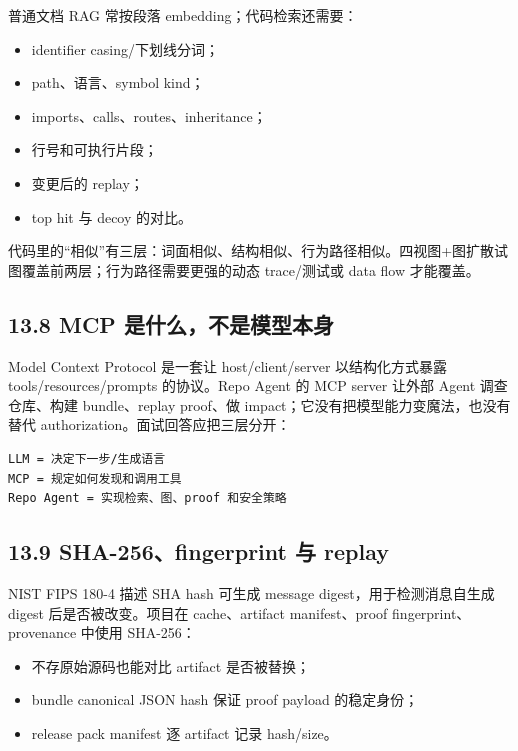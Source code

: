 \documentclass[UTF8,12pt,openany]{ctexbook}
\begin{document}
普通文档 RAG 常按段落 embedding；代码检索还需要：\par

\begin{itemize}
\item identifier casing/下划线分词；
\item path、语言、symbol kind；
\item imports、calls、routes、inheritance；
\item 行号和可执行片段；
\item 变更后的 replay；
\item top hit 与 decoy 的对比。
\end{itemize}

代码里的“相似”有三层：词面相似、结构相似、行为路径相似。四视图+图扩散试图覆盖前两层；行为路径需要更强的动态 trace/测试或 data flow 才能覆盖。\par

\subsection{13.8 MCP 是什么，不是模型本身}

Model Context Protocol 是一套让 host/client/server 以结构化方式暴露 tools/resources/prompts 的协议。Repo Agent 的 MCP server 让外部 Agent 调查仓库、构建 bundle、replay proof、做 impact；它没有把模型能力变魔法，也没有替代 authorization。面试回答应把三层分开：\par

\begin{lstlisting}
LLM = 决定下一步/生成语言
MCP = 规定如何发现和调用工具
Repo Agent = 实现检索、图、proof 和安全策略
\end{lstlisting}

\subsection{13.9 SHA-256、fingerprint 与 replay}

NIST FIPS 180-4 描述 SHA hash 可生成 message digest，用于检测消息自生成 digest 后是否被改变。项目在 cache、artifact manifest、proof fingerprint、provenance 中使用 SHA-256：\par

\begin{itemize}
\item 不存原始源码也能对比 artifact 是否被替换；
\item bundle canonical JSON hash 保证 proof payload 的稳定身份；
\item release pack manifest 逐 artifact 记录 hash/size。
\end{itemize}
\end{document}

